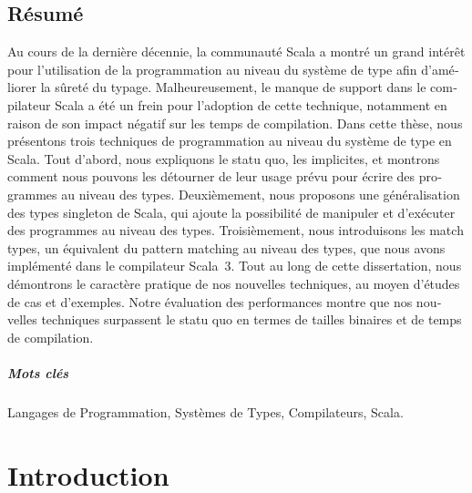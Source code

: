 \begin{otherlanguage}{french}
\cleardoublepage
\chapter*{Résumé}

Au cours de la dernière décennie, la communauté Scala a montré un grand intérêt pour l'utilisation de la programmation au niveau du système de type afin d'améliorer la sûreté du typage.
Malheureusement, le manque de support dans le compilateur Scala a été un frein pour l'adoption de cette technique, notamment en raison de son impact négatif sur les temps de compilation.
Dans cette thèse, nous présentons trois techniques de programmation au niveau du système de type en Scala.
Tout d'abord, nous expliquons le statu quo, les implicites, et montrons comment nous pouvons les détourner de leur usage prévu pour écrire des programmes au niveau des types.
Deuxièmement, nous proposons une généralisation des types singleton de Scala, qui ajoute la possibilité de manipuler et d'exécuter des programmes au niveau des types.
Troisièmement, nous introduisons les match types, un équivalent du pattern matching au niveau des types, que nous avons implémenté dans le compilateur Scala~3.
Tout au long de cette dissertation, nous démontrons le caractère pratique de nos nouvelles techniques, au moyen d'études de cas et d'exemples.
Notre évaluation des performances montre que nos nouvelles techniques surpassent le statu quo en termes de tailles binaires et de temps de compilation.

\paragraph{Mots clés} Langages de Programmation, Systèmes de Types, Compilateurs, Scala.

\end{otherlanguage}

\hypersetup{linkcolor=black}
\tableofcontents
\cleardoublepage
{}
{}
\listoffigures
\hypersetup{linkcolor=purplish}
\mainmatter


\chapter{Introduction}
\label{chap:introduction}

